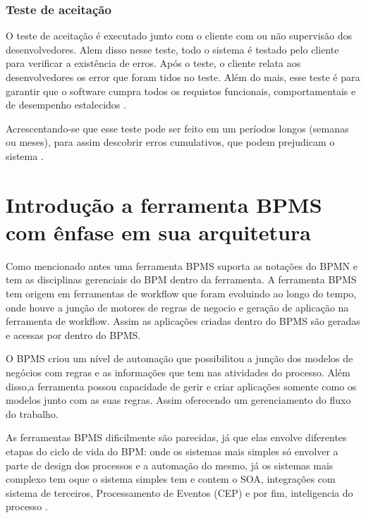     

    
    
    
    
    
\subsection{Teste de aceitação}
\label{sec:Teste de aceitação}
	O teste de aceitação é executado junto com o cliente com ou não supervisão dos desenvolvedores. Alem disso nesse teste, todo o sistema é testado pelo cliente para verificar a existência de erros. Após o teste, o cliente relata aos desenvolvedores os error que foram tidos no teste\cite{LivroAutomatizacao}. 
    Além do mais, esse teste é para garantir que o software cumpra todos os requistos funcionais, comportamentais e de desempenho estalecidos \cite{pressman}.
    
    Acrescentando-se que esse teste pode ser feito em um períodos longos (semanas ou meses), para assim descobrir erros cumulativos, que podem prejudicam o sistema \cite{pressman}. 
    
    
    
    


\chapter{Introdução a ferramenta BPMS com ênfase em sua arquitetura}
\label{cap:Introdução a ferramenta BPMS com ênfase em sua arquitetura}
Como mencionado antes uma ferramenta BPMS suporta as notações do BPMN e tem as disciplinas gerenciais do BPM dentro da ferramenta. A ferramenta BPMS tem origem em ferramentas de workflow que foram evoluindo ao longo do tempo, onde houve a junção de motores de regras de negocio e geração de aplicação na ferramenta de workflow. Assim as aplicações criadas dentro do BPMS são geradas e acessas por dentro do BPMS\cite{CBOK}.

O BPMS criou um nível de automação que possibilitou a junção dos modelos de negócios com regras e as informações que tem nas atividades do processo. Além disso,a ferramenta possou capacidade de gerir e criar aplicações somente como os modelos junto com as suas regras. Assim oferecendo um gerenciamento do fluxo do trabalho\cite{CBOK}.

As ferramentas BPMS dificilmente são parecidas, já que elas envolve diferentes etapas do ciclo de vida do BPM: onde os sistemas mais simples só envolver a parte de design dos processos e a automação do mesmo, já os sistemas mais complexo tem oque o sistema simples tem e contem o SOA, integrações com sistema de terceiros, Processamento de Eventos (CEP) e por fim, inteligencia do processo \cite{ProcessAwareBPM}.

